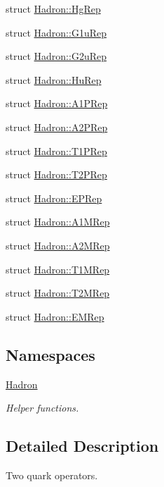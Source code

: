 \begin{DoxyCompactItemize}
struct \mbox{\hyperlink{structHadron_1_1HgRep}{Hadron\+::\+Hg\+Rep}}
\item 
struct \mbox{\hyperlink{structHadron_1_1G1uRep}{Hadron\+::\+G1u\+Rep}}
\item 
struct \mbox{\hyperlink{structHadron_1_1G2uRep}{Hadron\+::\+G2u\+Rep}}
\item 
struct \mbox{\hyperlink{structHadron_1_1HuRep}{Hadron\+::\+Hu\+Rep}}
\item 
struct \mbox{\hyperlink{structHadron_1_1A1PRep}{Hadron\+::\+A1\+P\+Rep}}
\item 
struct \mbox{\hyperlink{structHadron_1_1A2PRep}{Hadron\+::\+A2\+P\+Rep}}
\item 
struct \mbox{\hyperlink{structHadron_1_1T1PRep}{Hadron\+::\+T1\+P\+Rep}}
\item 
struct \mbox{\hyperlink{structHadron_1_1T2PRep}{Hadron\+::\+T2\+P\+Rep}}
\item 
struct \mbox{\hyperlink{structHadron_1_1EPRep}{Hadron\+::\+E\+P\+Rep}}
\item 
struct \mbox{\hyperlink{structHadron_1_1A1MRep}{Hadron\+::\+A1\+M\+Rep}}
\item 
struct \mbox{\hyperlink{structHadron_1_1A2MRep}{Hadron\+::\+A2\+M\+Rep}}
\item 
struct \mbox{\hyperlink{structHadron_1_1T1MRep}{Hadron\+::\+T1\+M\+Rep}}
\item 
struct \mbox{\hyperlink{structHadron_1_1T2MRep}{Hadron\+::\+T2\+M\+Rep}}
\item 
struct \mbox{\hyperlink{structHadron_1_1EMRep}{Hadron\+::\+E\+M\+Rep}}
\end{DoxyCompactItemize}
\subsection*{Namespaces}
\begin{DoxyCompactItemize}
\item 
 \mbox{\hyperlink{namespaceHadron}{Hadron}}
\begin{DoxyCompactList}\small\item\em Helper functions. \end{DoxyCompactList}\end{DoxyCompactItemize}


\subsection{Detailed Description}
Two quark operators. 

